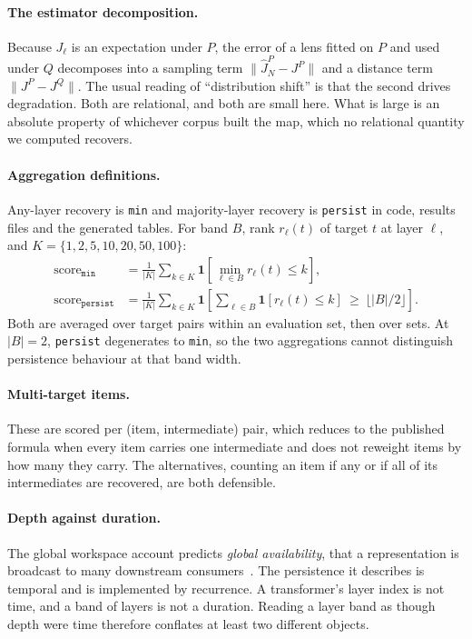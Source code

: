 \documentclass{article}
\newcommand{\mn}{\texttt{min}}
\newcommand{\pe}{\texttt{persist}}
\begin{document}
\paragraph{The estimator decomposition.} Because $J_\ell$ is an expectation under
$P$, the error of a lens fitted on $P$ and used under $Q$ decomposes into a sampling term
$\lVert\hat J^P_N - J^P\rVert$ and a distance term $\lVert J^P - J^Q\rVert$. The usual reading of
``distribution shift'' is that the second drives degradation. Both are relational, and both are
small here. What is large is an absolute property of whichever corpus built the map, which no
relational quantity we computed recovers.

\paragraph{Aggregation definitions.} Any-layer recovery is \mn{} and majority-layer recovery is \pe{}
in code, results files and the generated tables. For band $B$, rank $r_\ell(t)$ of target $t$ at
layer $\ell$, and $K=\{1,2,5,10,20,50,100\}$:
\begin{align*}
\mathrm{score}_{\mn} &= \tfrac{1}{|K|}\sum_{k\in K}\mathbf{1}\!\left[\min_{\ell\in B} r_\ell(t)\le k\right],\\
\mathrm{score}_{\pe} &= \tfrac{1}{|K|}\sum_{k\in K}\mathbf{1}\!\left[\textstyle\sum_{\ell\in B}\mathbf{1}[r_\ell(t)\le k]\ \ge\ \lfloor|B|/2\rfloor\right].
\end{align*}
Both are averaged over target pairs within an evaluation set, then over sets. At $|B|{=}2$, \pe{} degenerates to \mn, so the two aggregations cannot distinguish persistence
behaviour at that band width.

\paragraph{Multi-target items.} These are scored per (item, intermediate) pair, which reduces to the
published formula when every item carries one intermediate and does not reweight items by how many
they carry. The alternatives, counting an item if any or if all of its intermediates are recovered,
are both defensible.

\paragraph{Depth against duration.} The global workspace account predicts \emph{global availability},
that a representation is broadcast to many downstream consumers~\citep{dehaene1998workspace}. The
persistence it describes is temporal and is implemented by recurrence. A transformer's layer index
is not time, and a band of layers is not a duration. Reading a layer band as though depth were time
therefore conflates at least two different objects.
\end{document}
